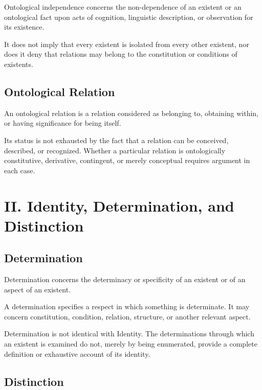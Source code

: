 Ontological independence concerns the non-dependence of an existent
or an ontological fact upon acts of cognition, linguistic description,
or observation for its existence.

It does not imply that every existent is isolated from every other
existent, nor does it deny that relations may belong to the constitution
or conditions of existents.


\subsection*{Ontological Relation}

An ontological relation is a relation considered as belonging to,
obtaining within, or having significance for being itself.

Its status is not exhausted by the fact that a relation can be conceived,
described, or recognized. Whether a particular relation is ontologically
constitutive, derivative, contingent, or merely conceptual requires
argument in each case.



\section*{II. Identity, Determination, and Distinction}


\subsection*{Determination}

Determination concerns the determinacy or specificity of an existent
or of an aspect of an existent.

A determination specifies a respect in which something is determinate.
It may concern constitution, condition, relation, structure, or another
relevant aspect.

Determination is not identical with Identity. The determinations through
which an existent is examined do not, merely by being enumerated, provide
a complete definition or exhaustive account of its identity.


\subsection*{Distinction}

